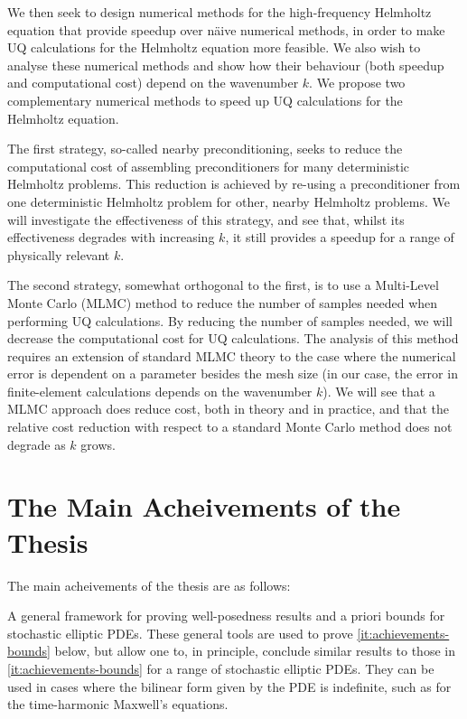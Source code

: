 We then seek to design numerical methods for the high-frequency Helmholtz equation that provide speedup over n\"aive numerical methods, in order to make UQ calculations for the Helmholtz equation more feasible. We also wish to analyse these numerical methods and show how their behaviour (both speedup and computational cost) depend on the wavenumber $k$. We propose two complementary numerical methods to speed up UQ calculations for the Helmholtz equation.

The first strategy, so-called nearby preconditioning, seeks to reduce the computational cost of assembling preconditioners for many deterministic Helmholtz problems. This reduction is achieved by re-using a preconditioner from one deterministic Helmholtz problem for other, nearby Helmholtz problems. We will investigate the effectiveness of this strategy, and see that, whilst its effectiveness degrades with increasing $k$, it still provides a speedup for a range of physically relevant $k$.

The second strategy, somewhat orthogonal to the first, is to use a Multi-Level Monte Carlo (MLMC) method to reduce the number of samples needed when performing UQ calculations. By reducing the number of samples needed, we will decrease the computational cost for UQ calculations. The analysis of this method requires an extension of standard MLMC theory to the case where the numerical error is dependent on a parameter besides the mesh size (in our case, the error in finite-element calculations depends on the wavenumber $k$). We will see that a MLMC approach does reduce cost, both in theory and in practice, and that the relative cost reduction with respect to a standard Monte Carlo method does not degrade as $k$ grows.


\section{The Main Acheivements of the Thesis}

The main acheivements of the thesis are as follows:

\ben
\item A general framework for proving well-posedness results and a priori bounds for stochastic elliptic PDEs. These general tools are used to prove \cref{it:achievements-bounds} below, but allow one to, in principle, conclude similar results to those in \cref{it:achievements-bounds} for a range of stochastic elliptic PDEs. They can be used in cases where the bilinear form given by the PDE is indefinite, such as for the time-harmonic Maxwell's equations.

